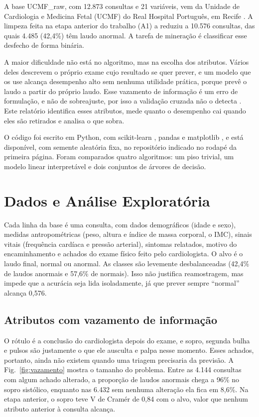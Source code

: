 \documentclass[conference]{IEEEtran}
\begin{document}
A base UCMF\_raw, com 12.873 consultas e 21 variáveis, vem da Unidade de Cardiologia e Medicina Fetal (UCMF) do Real Hospital Português, em Recife \cite{dados}. A limpeza feita na etapa anterior do trabalho (A1) a reduziu a 10.576 consultas, das quais 4.485 (42,4\%) têm laudo anormal. A tarefa de mineração é classificar esse desfecho de forma binária.

A maior dificuldade não está no algoritmo, mas na escolha dos atributos. Vários deles descrevem o próprio exame cujo resultado se quer prever, e um modelo que os use alcança desempenho alto sem nenhuma utilidade prática, porque prevê o laudo a partir do próprio laudo. Esse vazamento de informação é um erro de formulação, e não de sobreajuste, por isso a validação cruzada não o detecta \cite{kaufman}. Este relatório identifica esses atributos, mede quanto o desempenho cai quando eles são retirados e analisa o que sobra.

O código foi escrito em Python, com scikit-learn \cite{sklearn}, pandas \cite{pandas} e matplotlib \cite{matplotlib}, e está disponível, com semente aleatória fixa, no repositório indicado no rodapé da primeira página. Foram comparados quatro algoritmos: um piso trivial, um modelo linear interpretável e dois conjuntos de árvores de decisão.

\section{Dados e Análise Exploratória}
Cada linha da base é uma consulta, com dados demográficos (idade e sexo), medidas antropométricas (peso, altura e índice de massa corporal, o IMC), sinais vitais (frequência cardíaca e pressão arterial), sintomas relatados, motivo do encaminhamento e achados do exame físico feito pelo cardiologista. O alvo é o laudo final, normal ou anormal. As classes são levemente desbalanceadas (42,4\% de laudos anormais e 57,6\% de normais). Isso não justifica reamostragem, mas impede que a acurácia seja lida isoladamente, já que prever sempre ``normal'' alcança 0,576.

\subsection{Atributos com vazamento de informação}
O rótulo é a conclusão do cardiologista depois do exame, e sopro, segunda bulha e pulsos são justamente o que ele ausculta e palpa nesse momento. Esses achados, portanto, ainda não existem quando uma triagem precisaria da previsão. A Fig.~\ref{fig:vazamento} mostra o tamanho do problema. Entre as 4.144 consultas com algum achado alterado, a proporção de laudos anormais chega a 96\% no sopro sistólico, enquanto nas 6.432 sem nenhuma alteração ela fica em 8,6\%. Na etapa anterior, o sopro teve V de Cramér de 0,84 com o alvo, valor que nenhum atributo anterior à consulta alcança.
\end{document}
